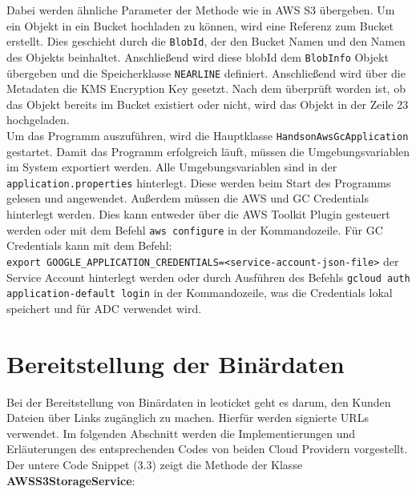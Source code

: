 Dabei werden ähnliche Parameter der Methode wie in AWS S3 übergeben. Um ein Objekt in ein Bucket hochladen zu können, wird eine Referenz zum Bucket erstellt. Dies geschieht durch die \verb|BlobId|, der den Bucket Namen und den Namen des Objekts beinhaltet. Anschließend wird diese blobId dem \verb|BlobInfo| Objekt übergeben und die Speicherklasse \verb|NEARLINE| definiert. Anschließend wird über die Metadaten die KMS Encryption Key gesetzt. Nach dem überprüft worden ist, ob das Objekt bereits im Bucket existiert oder nicht, wird das Objekt in der Zeile 23 hochgeladen.\\

Um das Programm auszuführen, wird die Hauptklasse \verb|HandsonAwsGcApplication| gestartet. Damit das Programm erfolgreich läuft, müssen die Umgebungsvariablen im System exportiert werden. Alle Umgebungsvariablen sind in der \verb|application.properties| hinterlegt. Diese werden beim Start des Programms gelesen und angewendet. Außerdem müssen die AWS und GC Credentials hinterlegt werden. Dies kann entweder über die AWS Toolkit Plugin gesteuert werden oder mit dem Befehl \verb|aws configure| in der Kommandozeile. Für GC Credentials kann mit dem Befehl: \\ \verb|export GOOGLE_APPLICATION_CREDENTIALS=<service-account-json-file>| der Service Account hinterlegt werden oder durch Ausführen des Befehls \verb|gcloud auth application-default login| in der Kommandozeile, was die Credentials lokal speichert und für ADC verwendet wird.

\newpage

\section{Bereitstellung der Binärdaten}

Bei der Bereitstellung von Binärdaten in leoticket geht es darum, den Kunden Dateien über Links zugänglich zu machen. Hierfür werden signierte URLs verwendet. Im folgenden Abschnitt werden die Implementierungen und Erläuterungen des entsprechenden Codes von beiden Cloud Providern vorgestellt.\\

Der untere Code Snippet (3.3) zeigt die Methode der Klasse \textbf{AWSS3StorageService}:

